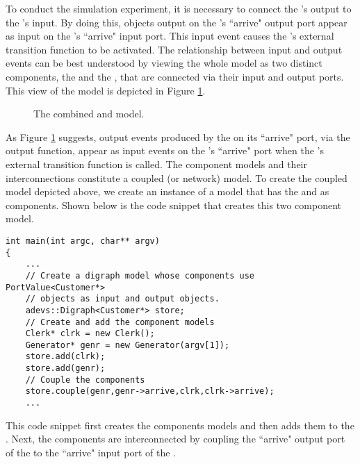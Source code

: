 To conduct the simulation experiment, it is necessary to connect the 's output to the 's input.  By doing this,  objects output on the 's ``arrive" output port appear as input on the 's ``arrive" input port. This input event causes the 's external transition function to be activated. The relationship between input and output events can be best understood by viewing the whole model as two distinct components, the  and the , that are connected via their input and output ports. This view of the model is depicted in Figure \ref{fig:clerk_and_generator}.
\begin{figure}[ht]
\centering
{}
\caption{The combined  and  model.}
\label{fig:clerk_and_generator}
\end{figure}

As Figure \ref{fig:clerk_and_generator} suggests, output events produced by the  on its ``arrive" port, via the output function, appear as input events on the 's ``arrive" port when the 's external transition function is called. The component models and their interconnections constitute a coupled (or network) model. To create the coupled model depicted above, we create an instance of a  model that has the  and  as components. Shown below is the code snippet that creates this two component model.
\begin{verbatim}
int main(int argc, char** argv)
{
    ...
    // Create a digraph model whose components use PortValue<Customer*>
    // objects as input and output objects.
    adevs::Digraph<Customer*> store;
    // Create and add the component models
    Clerk* clrk = new Clerk();
    Generator* genr = new Generator(argv[1]); 
    store.add(clrk);
    store.add(genr);
    // Couple the components
    store.couple(genr,genr->arrive,clrk,clrk->arrive);
    ...
\end{verbatim}
This code snippet first creates the components models and then adds them to the . Next, the components are interconnected by coupling the ``arrive" output port of the  to the ``arrive" input port of the .

